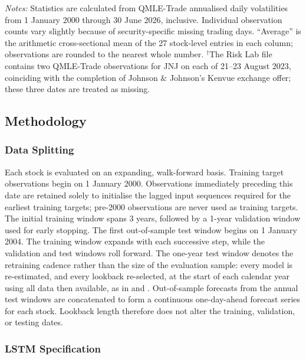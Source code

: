 \documentclass[12pt]{article}
\begin{document}
\begin{table}[!htbp]
\vspace{0.5em}
\begin{minipage}{0.94\textwidth}
\footnotesize
\textit{Notes:} Statistics are calculated from QMLE-Trade annualised daily volatilities from 1 January 2000 through 30 June 2026, inclusive. Individual observation counts vary slightly because of security-specific missing trading days. ``Average'' is the arithmetic cross-sectional mean of the 27 stock-level entries in each column; observations are rounded to the nearest whole number. $^{\dagger}$The Risk Lab file contains two QMLE-Trade observations for JNJ on each of 21--23 August 2023, coinciding with the completion of Johnson \& Johnson's Kenvue exchange offer; these three dates are treated as missing.
\end{minipage}
\end{table}


\subsection{Methodology}

\subsubsection{Data Splitting}

Each stock is evaluated on an expanding, walk-forward basis. Training target observations begin on 1 January 2000. Observations immediately preceding this date are retained solely to initialise the lagged input sequences required for the earliest training targets; pre-2000 observations are never used as training targets. The initial training window spans 3 years, followed by a 1-year validation window used for early stopping. The first out-of-sample test window begins on 1 January 2004. The training window expands with each successive step, while the validation and test windows roll forward. The one-year test window denotes the retraining cadence rather than the size of the evaluation sample: every model is re-estimated, and every lookback re-selected, at the start of each calendar year using all data then available, as in \textcite{gu-2020} and \textcite{zhang-2023}. Out-of-sample forecasts from the annual test windows are concatenated to form a continuous one-day-ahead forecast series for each stock. Lookback length therefore does not alter the training, validation, or testing dates.

\subsubsection{LSTM Specification}
\end{document}
